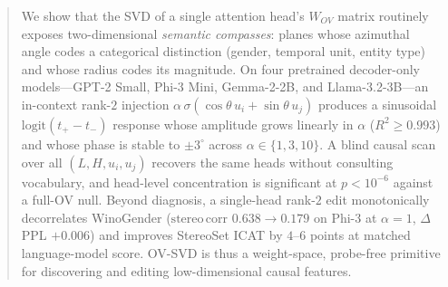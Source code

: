 \begin{abstract}
We show that the SVD of a single attention head's $W_{OV}$ matrix
routinely exposes two-dimensional \emph{semantic compasses}: planes
whose azimuthal angle codes a categorical distinction (gender,
temporal unit, entity type) and whose radius codes its magnitude.
On four pretrained decoder-only models---GPT-2 Small, Phi-3 Mini,
Gemma-2-2B, and Llama-3.2-3B---an in-context rank-$2$ injection
$\alpha\,\sigma(\cos\theta\,u_i + \sin\theta\,u_j)$ produces a
sinusoidal $\mathrm{logit}(t_{+} - t_{-})$ response whose amplitude
grows linearly in $\alpha$ ($R^2 \ge 0.993$) and whose phase is
stable to $\pm 3^\circ$ across $\alpha \in \{1,3,10\}$. A blind
causal scan over all $(L, H, u_i, u_j)$ recovers the same heads
without consulting vocabulary, and head-level concentration is
significant at $p<10^{-6}$ against a full-OV null. Beyond
diagnosis, a single-head rank-$2$ edit monotonically decorrelates
WinoGender ($\mathrm{stereo\,corr}$ $0.638 \to 0.179$ on Phi-3 at
$\alpha=1$, $\Delta$PPL $+0.006$) and improves StereoSet ICAT by
$4\text{--}6$ points at matched language-model score. OV-SVD is
thus a weight-space, probe-free primitive for discovering and
editing low-dimensional causal features.
\end{abstract}
